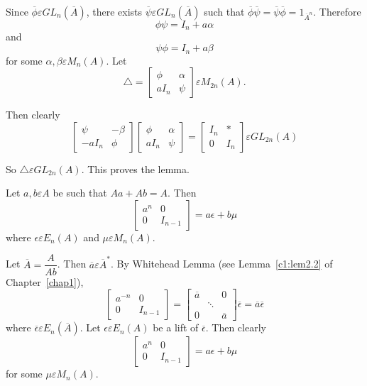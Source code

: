 \begin{Proof}
Since $\overline{\phi}\varepsilon GL_n(\overline{A})$, there exists
$\overline{\psi} \varepsilon GL_n(\overline{A})$ such that
$\overline{\phi}\overline{\psi}=\overline{\psi}\overline{\phi}=1_{\overline{A}^{n}}$. Therefore
$$
\phi \psi=I_n+a\alpha
$$
and
$$
\psi\phi=I_n+a\beta
$$
for some $\alpha, \beta \varepsilon M_n(A)$. Let 
$$
\triangle=
\begin{bmatrix}
\phi& \alpha\\
aI_n & \psi
\end{bmatrix} \varepsilon M_{2n}(A).
$$

Then clearly
$$
\begin{bmatrix}
\psi & -\beta\\
-aI_n & \phi
\end{bmatrix} \begin{bmatrix}
\phi & \alpha\\
aI_n & \psi
\end{bmatrix} = \begin{bmatrix}
I_n & \ast\\
0 & I_n
\end{bmatrix} \varepsilon GL_{2n}(A)
$$

So $\triangle \varepsilon GL_{2n}(A)$. This proves the lemma.
\enprf
\end{Proof}

\begin{lem}\label{c5:lem1.4}
Let $a,b \varepsilon A$ be such that $Aa+Ab=A$. Then 
$$
\begin{bmatrix}
a^{n} & 0\\
0 & I_{n-1}
\end{bmatrix} = a\epsilon + b\mu
$$
where $\epsilon \varepsilon E_n(A)$ and $\mu \varepsilon M_n(A)$.
\end{lem}

\begin{Proof}
Let $\overline{A}=\dfrac{A}{Ab}$. Then $\overline{a}\varepsilon
\overline{A}^{\ast}$. By Whitehead Lemma (see Lemma~\ref{c1:lem2.2} of
Chapter~\ref{chap1}),
$$
\begin{bmatrix}
a^{-n} & 0\\
0 & I_{n-1}
\end{bmatrix} =\begin{bmatrix}
\overline{a}& &0\\
&\ddots &\\
0 & &\overline{a}
\end{bmatrix} \overline{\epsilon} =\overline{a}\overline{\epsilon}
$$
where $\overline{\epsilon} \varepsilon E_n(\overline{A})$. Let
$\epsilon \varepsilon E_n(A)$ be a lift of $\overline{\epsilon}$. Then
clearly
$$
\begin{bmatrix}
a^{n} & 0\\
0 & I_{n-1}
\end{bmatrix}=a\epsilon +b\mu
$$
for some $\mu \varepsilon M_n(A)$.
\enprf
\end{Proof}

